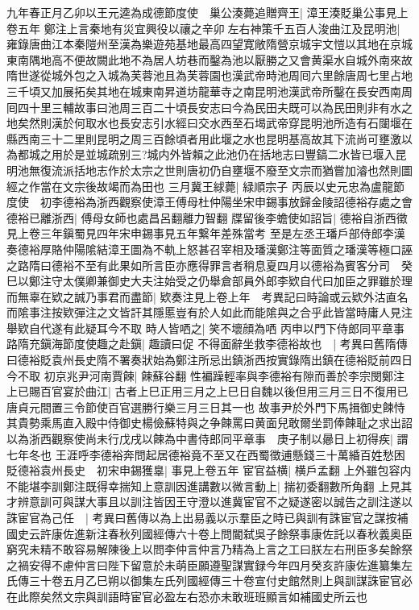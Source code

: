 九年春正月乙卯以王元逵為成德節度使　巢公湊薨追贈齊王|{
	漳王湊貶巢公事見上卷五年}
鄭注上言秦地有災宜興役以禳之辛卯左右神策千五百人浚曲江及昆明池|{
	雍錄唐曲江本秦隑州至漢為樂遊苑基地最高四望寛敞隋營京城宇文愷以其地在京城東南隅地高不便故闕此地不為居人坊巷而鑿為池以厭勝之又會黄渠水自城外南來故隋世遂從城外包之入城為芙蓉池且為芙蓉園也漢武帝時池周囘六里餘唐周七里占地三千頃又加展拓矣其地在城東南昇道坊龍華寺之南昆明池漢武帝所鑿在長安西南周囘四十里三輔故事曰池周三百二十頃長安志曰今為民田夫既可以為民田則非有水之地矣然則漢於何取水也長安志引水經曰交水西至石堨武帝穿昆明池所造有石闥堰在縣西南三十二里則昆明之周三百餘頃者用此堰之水也昆明基高故其下流尚可壅激以為都城之用於是並城疏别三?城内外皆賴之此池仍在括地志曰豐鎬二水皆已堰入昆明池無復流派括地志作於太宗之世則唐初仍自壅堰不廢至文宗而猶嘗加濬也然則圖經之作當在文宗後故竭而為田也}
三月冀王絿薨|{
	緑順宗子}
丙辰以史元忠為盧龍節度使　初李德裕為浙西觀察使漳王傅母杜仲陽坐宋申錫事放歸金陵詔德裕存處之會德裕已離浙西|{
	傅母女師也處昌呂翻離力智翻}
牒留後李蟾使如詔旨|{
	德裕自浙西徵見上卷三年鎭蜀見四年宋申錫事見五年繋年差殊當考}
至是左丞王璠戶部侍郎李漢奏德裕厚賂仲陽隂結漳王圖為不軌上怒甚召宰相及璠漢鄭注等面質之璠漢等極口誣之路隋曰德裕不至有此果如所言臣亦應得罪言者稍息夏四月以德裕為賓客分司　癸巳以鄭注守太僕卿兼御史大夫注始受之仍舉倉部員外郎李欵自代曰加臣之罪雖於理而無辜在欵之誠乃事君而盡節|{
	欵奏注見上卷上年　考異記曰時論或云欵外沽直名而隂事注按欵彈注之文皆訐其隱慝豈有於人如此而能隂與之合乎此皆當時庸人見注舉欵自代遂有此疑耳今不取}
時人皆哂之|{
	笑不壞顔為哂}
丙申以門下侍郎同平章事路隋充鎭海節度使趣之赴鎭|{
	趣讀曰促}
不得面辭坐救李德裕故也　|{
	考異曰舊隋傳曰德裕貶袁州長史隋不署奏狀始為鄭注所忌出鎮浙西按實錄隋出鎮在德裕貶前四日今不取}
初京兆尹河南賈餗|{
	餗蘇谷翻}
性褊躁輕率與李德裕有隙而善於李宗閔鄭注上已賜百官宴於曲江|{
	古者上巳正用三月之上巳日自魏以後但用三月三日不復用已唐貞元間置三令節使百官選勝行樂三月三日其一也}
故事尹於外門下馬揖御史餗恃其貴勢乘馬直入殿中侍御史楊儉蘇特與之争餗罵曰黄面兒敢爾坐罰俸餗耻之求出詔以為浙西觀察使尚未行戊戌以餗為中書侍郎同平章事　庚子制以曏日上初得疾|{
	謂七年冬也}
王涯呼李德裕奔問起居德裕竟不至又在西蜀徵逋懸錢三十萬緍百姓愁困貶德裕袁州長史　初宋申錫獲辠|{
	事見上卷五年}
宦官益横|{
	横戶孟翻}
上外雖包容内不能堪李訓鄭注既得幸揣知上意訓因進講數以微言動上|{
	揣初委翻數所角翻}
上見其才辨意訓可與謀大事且以訓注皆因王守澄以進冀宦官不之疑遂密以誠告之訓注遂以誅宦官為己任　|{
	考異曰舊傳以為上出易義以示羣臣之時已與訓有誅宦官之謀按補國史云許康佐進新注春秋列國經傳六十卷上問閽弑吳子餘祭事康佐託以春秋義奥臣窮究未精不敢容易解陳後上以問李仲言仲言乃精為上言之工曰朕左右刑臣多矣餘祭之禍安得不慮仲言曰陛下留意於未萌臣願遵聖謀實録今年四月癸亥許康佐進纂集左氏傳三十卷五月乙巳朔以御集左氏列國經傳三十卷宣付史館然則上與訓謀誅宦官必在此際矣然文宗與訓語時宦官必盈左右恐亦未敢班班顯言如補國史所云也}
